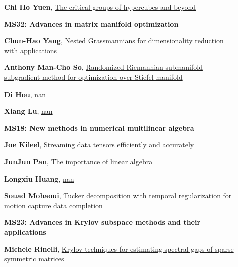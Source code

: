 \documentclass[ILAS2025-program.tex]{subfiles}
\begin{document}
\begin{description}
\begin{description}
        \item[] \hypertarget{up0184}{}\textbf{Chi Ho Yuen}, \hyperlink{down0184}{The critical groups of hypercubes and beyond}
        \end{description}
    \begin{description}
    \item[] {\color{mstitle}\textbf{MS32: Advances in matrix manifold optimization}} 
    \item[] \hypertarget{up0185}{}\textbf{Chun-Hao Yang}, \hyperlink{down0185}{Nested Grassmannians for dimensionality reduction with applications}
        \item[] \hypertarget{up0186}{}\textbf{Anthony Man-Cho So}, \hyperlink{down0186}{Randomized Riemannian submanifold subgradient method for optimization over Stiefel manifold}
        \item[] \hypertarget{up0187}{}\textbf{Di Hou}, \hyperlink{down0187}{nan}
        \item[] \hypertarget{up0188}{}\textbf{Xiang Lu}, \hyperlink{down0188}{nan}
        \end{description}
    \begin{description}
    \item[] {\color{mstitle}\textbf{MS18: New methods in numerical multilinear algebra}} 
    \item[] \hypertarget{up0189}{}\textbf{Joe Kileel}, \hyperlink{down0189}{Streaming data tensors efficiently and accurately
}
        \item[] \hypertarget{up0190}{}\textbf{JunJun Pan}, \hyperlink{down0190}{The importance of linear algebra
}
        \item[] \hypertarget{up0191}{}\textbf{Longxiu Huang}, \hyperlink{down0191}{nan}
        \item[] \hypertarget{up0192}{}\textbf{Souad Mohaoui}, \hyperlink{down0192}{Tucker decomposition with temporal regularization for motion capture data completion}
        \end{description}
    \begin{description}
    \item[] {\color{mstitle}\textbf{MS23: Advances in Krylov subspace methods and their applications}} 
    \item[] \hypertarget{up0193}{}\textbf{Michele Rinelli}, \hyperlink{down0193}{Krylov techniques for estimating spectral gaps of sparse symmetric matrices}

\end{description}
\end{description}
\end{document}
